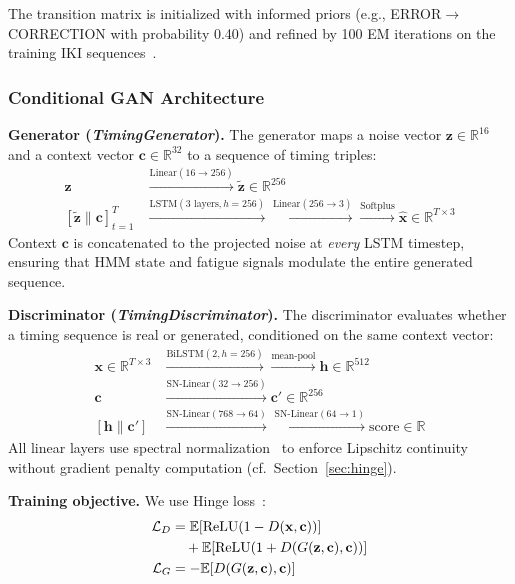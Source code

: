 \documentclass[sigconf,nonacm]{acmart}
\begin{document}
The transition matrix is initialized with informed priors (e.g.,
ERROR$\!\to\!$CORRECTION with probability 0.40) and refined by 100 EM iterations on
the training IKI sequences~\cite{hmmlearn}.

\subsubsection{Conditional GAN Architecture}

\textbf{Generator (\textit{TimingGenerator}).}
The generator maps a noise vector $\mathbf{z} \in \mathbb{R}^{16}$ and a context vector
$\mathbf{c} \in \mathbb{R}^{32}$ to a sequence of timing triples:
\begin{align*}
\mathbf{z} &\xrightarrow{\text{Linear}(16 \to 256)} \tilde{\mathbf{z}} \in \mathbb{R}^{256} \\
[\tilde{\mathbf{z}} \| \mathbf{c}]_{t=1}^{T} &\xrightarrow{\text{LSTM}(3\text{ layers}, h{=}256)}
  \xrightarrow{\text{Linear}(256 \to 3)} \xrightarrow{\text{Softplus}} \hat{\mathbf{x}} \in \mathbb{R}^{T \times 3}
\end{align*}
Context $\mathbf{c}$ is concatenated to the projected noise at \emph{every} LSTM
timestep, ensuring that HMM state and fatigue signals modulate the entire generated
sequence.

\textbf{Discriminator (\textit{TimingDiscriminator}).}
The discriminator evaluates whether a timing sequence is real or generated, conditioned
on the same context vector:
\begin{align*}
\mathbf{x} \in \mathbb{R}^{T \times 3} &\xrightarrow{\text{BiLSTM}(2, h{=}256)}
\xrightarrow{\text{mean-pool}} \mathbf{h} \in \mathbb{R}^{512} \\
\mathbf{c} &\xrightarrow{\text{SN-Linear}(32 \to 256)} \mathbf{c}' \in \mathbb{R}^{256} \\
[\mathbf{h} \| \mathbf{c}'] &\xrightarrow{\text{SN-Linear}(768 \to 64)} \xrightarrow{\text{SN-Linear}(64 \to 1)}
\text{score} \in \mathbb{R}
\end{align*}
All linear layers use spectral normalization~\cite{miyato2018spectral} to enforce
Lipschitz continuity without gradient penalty computation (cf.\ Section~\ref{sec:hinge}).

\textbf{Training objective.} We use Hinge loss~\cite{goodfellow2014gan}:
\begin{align}
\mathcal{L}_D &= \mathbb{E}[\text{ReLU}(1 - D(\mathbf{x}, \mathbf{c}))] \notag \\
              &\quad + \mathbb{E}[\text{ReLU}(1 + D(G(\mathbf{z}, \mathbf{c}), \mathbf{c}))] \\
\mathcal{L}_G &= -\mathbb{E}[D(G(\mathbf{z}, \mathbf{c}), \mathbf{c})]
\end{align}
\end{document}
